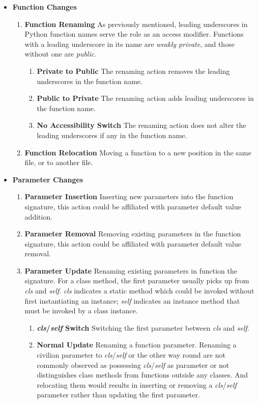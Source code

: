 \begin{itemize}
	\item \textbf{Function Changes}
	\begin{enumerate}
		\item \textbf{Function Renaming} As previously mentioned, leading underscores in Python function names serve the role as an access modifier. Functions with a leading underscore in its name are \textit{weakly private}, and those without one are \textit{public}.
		\begin{enumerate}
			\item \textbf{Private to Public} The renaming action removes the leading underscores in the function name.
			\item \textbf{Public to Private} The renaming action adds leading underscores in the function name.
			\item \textbf{No Accessibility Switch} The renaming action does not alter the leading underscores if any in the function name.
		\end{enumerate}
		\item \textbf{Function Relocation} Moving a function to a new position in the same file, or to another file.
	\end{enumerate}

	\item \textbf{Parameter Changes}
	\begin{enumerate}
		\item \textbf{Parameter Insertion} Inserting new parameters into the function signature, this action could be affiliated with parameter default value addition.
		\item \textbf{Parameter Removal} Removing existing parameters in the function signature, this action could be affiliated with parameter default value removal.
		\item \textbf{Parameter Update} Renaming existing parameters in function the signature. For a class method, the first parameter usually picks up from \textit{cls} and \textit{self}. \textit{cls} indicates a static method which could be invoked without first instantiating an instance; \textit{self} indicates an instance method that must be invoked by a class instance.
		\begin{enumerate}
			\item \textbf{\textit{cls}/\textit{self} Switch} Switching the first parameter between \textit{cls} and \textit{self}.
			\item \textbf{Normal Update} Renaming a function parameter. Renaming a civilian parameter to \textit{cls}/\textit{self} or the other way round are not commonly observed as possessing \textit{cls}/\textit{self} as parameter or not distinguishes class methods from functions outside any classes. And relocating them would results in inserting or removing a \textit{cls}/\textit{self} parameter rather than updating the first parameter.
		\end{enumerate}
	\end{enumerate}


\end{itemize}
